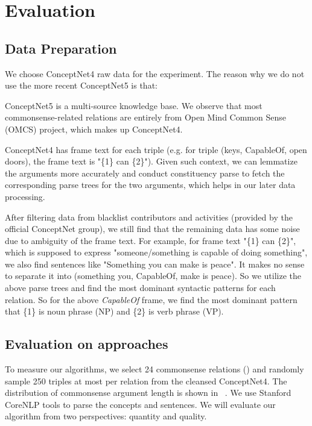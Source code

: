 \section{Evaluation}
\label{sec:eval}

\subsection{Data Preparation}

We choose ConceptNet4 raw data for the experiment. The reason why we do not use the more recent ConceptNet5 is that: 
\begin{enumerate*}[label=(\alph*)]
\item ConceptNet5 is a multi-source knowledge base. We observe that most commonsense-related relations are entirely from Open Mind Common Sense (OMCS) project, which makes up ConceptNet4. 

\item ConceptNet4 has frame text for each triple (e.g. for triple (keys, CapableOf, open doors), the frame text is "\{1\} can \{2\}"). Given such context, we can lemmatize the arguments more accurately and conduct constituency parse to fetch the corresponding parse trees for the two arguments, which helps in our later data processing. 

\end{enumerate*}

After filtering data from blacklist contributors and activities (provided by the official ConceptNet group), we still find that the remaining data has some noise due to ambiguity of the frame text. For example, for frame text "\{1\} can \{2\}", which is supposed to express "someone/something is capable of doing something", we also find sentences like "Something you can make is peace". It makes no sense to separate it into (something you, CapableOf, make is peace). So we utilize the above parse trees and find the most dominant syntactic patterns for each relation. So for the above \textit{CapableOf} frame, we find the most dominant pattern that \{1\} is noun phrase (NP) and \{2\} is verb phrase (VP).

\subsection{Evaluation on approaches}

To measure our algorithms, we select 24 commonsense relations () and randomly sample 250 triples at most per relation from the cleansed ConceptNet4. The distribution of commonsense argument length is shown in \
. We use Stanford CoreNLP tools to parse the concepts and sentences. 
We will evaluate our algorithm from two perspectives: quantity and quality. 


